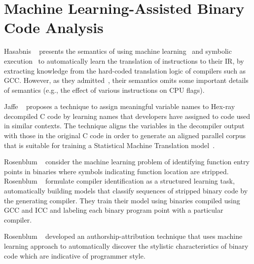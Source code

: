 \section{Machine Learning-Assisted Binary Code Analysis}\label{sec:ml}

Hasabnis \etal~\cite{Hasabnis:ASPLOS16, Hasabnis:FSE16} presents the semantics of \ISA using machine learning~\cite{Hasabnis:ASPLOS16} and symbolic 
execution~\cite{Hasabnis:FSE16} to automatically learn the translation of \ISA instructions to their IR, by extracting knowledge from the hard-coded  translation logic of compilers such as GCC.
However, as they admitted~\cite{Hasabnis:FSE16}, their semantics omits some important details of \ISA semantics (e.g., the effect of various instructions on CPU flags).


Jaffe \etal~\cite{Jaffe:2018ICPC} proposes a technique to assign meaningful
variable names to Hex-ray~\cite{hexray} decompiled C code by learning names
that developers have assigned to code used in similar contexts. The technique
aligns the variables in the decompiler output with those in the original C code
in order to generate an aligned parallel corpus that is suitable for training a
Statistical Machine Translation model~\cite{Koehn:2007}.  

Rosenblum \etal~\cite{Rosenblum2007,Rosenblum:2008}%
consider
the machine learning problem of identifying function entry points in binaries
where symbols indicating function location are stripped.
%
Rosenblum \etal~\cite{Rosenblum:2010} formulate compiler identification as a
structured learning task, automatically building models that classify sequences
of stripped binary code by the generating compiler. They train their model
using binaries compiled using GCC and ICC and labeling each binary program
point with a particular compiler.
%

Rosenblum \etal~\cite{Rosenblum:2011} developed an authorship-attribution
technique that uses machine learning approach to automatically discover the
stylistic characteristics of binary code which are indicative of programmer
style.


